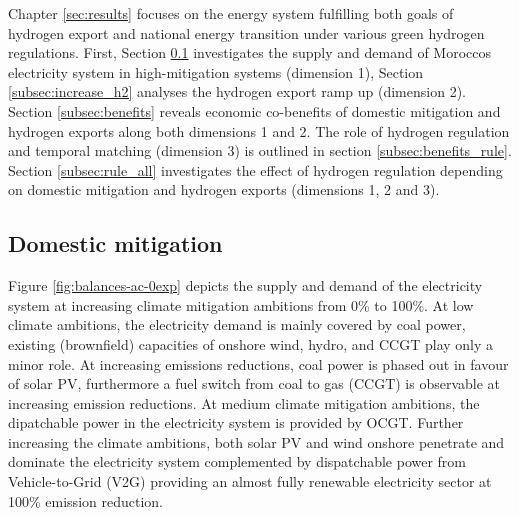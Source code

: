 Chapter \ref{sec:results} focuses on the energy system fulfilling both goals of hydrogen export and national energy transition under various green hydrogen regulations. First, Section \ref{subsec:increase_limit} investigates the supply and demand of Moroccos electricity system in high-mitigation systems (dimension 1), Section \ref{subsec:increase_h2} analyses the hydrogen export ramp up (dimension 2). Section \ref{subsec:benefits} reveals economic co-benefits of domestic mitigation and hydrogen exports along both dimensions 1 and 2. The role of hydrogen regulation and temporal matching (dimension 3) is outlined in section \ref{subsec:benefits_rule}. Section \ref{subsec:rule_all} investigates the effect of hydrogen regulation depending on domestic mitigation and hydrogen exports (dimensions 1, 2 and 3).






\subsection{Domestic mitigation}
\label{subsec:increase_limit}
Figure \ref{fig:balances-ac-0exp} depicts the supply and demand of the electricity system at increasing climate mitigation ambitions from 0\% to 100\%. At low climate ambitions, the electricity demand is mainly covered by coal power, existing (brownfield) capacities of onshore wind, hydro, and CCGT play only a minor role. 
At increasing emissions reductions, coal power is phased out in favour of solar PV, furthermore a fuel switch from coal to gas (CCGT) is observable at increasing emission reductions. At medium climate mitigation ambitions, the dipatchable power in the electricity system is provided by OCGT. 
Further increasing the climate ambitions, both solar PV and wind onshore penetrate and dominate the electricity system complemented by dispatchable power from Vehicle-to-Grid (V2G) providing an almost fully renewable electricity sector at 100\% emission reduction. 


